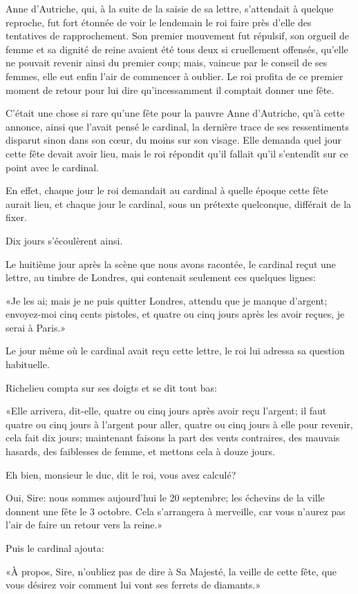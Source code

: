 Anne d'Autriche, qui, à la suite de la saisie de sa lettre, s'attendait à quelque reproche, fut fort étonnée de voir le lendemain le roi faire près d'elle des tentatives de rapprochement. Son premier mouvement fut répulsif, son orgueil de femme et sa dignité de reine avaient été tous deux si cruellement offensés, qu'elle ne pouvait revenir ainsi du premier coup; mais, vaincue par le conseil de ses femmes, elle eut enfin l'air de commencer à oublier. Le roi profita de ce premier moment de retour pour lui dire qu'incessamment il comptait donner une fête. 

C'était une chose si rare qu'une fête pour la pauvre Anne d'Autriche, qu'à cette annonce, ainsi que l'avait pensé le cardinal, la dernière trace de ses ressentiments disparut sinon dans son cœur, du moins sur son visage. Elle demanda quel jour cette fête devait avoir lieu, mais le roi répondit qu'il fallait qu'il s'entendît sur ce point avec le cardinal. 

En effet, chaque jour le roi demandait au cardinal à quelle époque cette fête aurait lieu, et chaque jour le cardinal, sous un prétexte quelconque, différait de la fixer. 

Dix jours s'écoulèrent ainsi. 

Le huitième jour après la scène que nous avons racontée, le cardinal reçut une lettre, au timbre de Londres, qui contenait seulement ces quelques lignes: 

«Je les ai; mais je ne puis quitter Londres, attendu que je manque d'argent; envoyez-moi cinq cents pistoles, et quatre ou cinq jours après les avoir reçues, je serai à Paris.» 

Le jour même où le cardinal avait reçu cette lettre, le roi lui adressa sa question habituelle. 

Richelieu compta sur ses doigts et se dit tout bas: 

«Elle arrivera, dit-elle, quatre ou cinq jours après avoir reçu l'argent; il faut quatre ou cinq jours à l'argent pour aller, quatre ou cinq jours à elle pour revenir, cela fait dix jours; maintenant faisons la part des vents contraires, des mauvais hasards, des faiblesses de femme, et mettons cela à douze jours. 

\speak  Eh bien, monsieur le duc, dit le roi, vous avez calculé? 

\speak  Oui, Sire: nous sommes aujourd'hui le 20 septembre; les échevins de la ville donnent une fête le 3 octobre. Cela s'arrangera à merveille, car vous n'aurez pas l'air de faire un retour vers la reine.» 

Puis le cardinal ajouta: 

«À propos, Sire, n'oubliez pas de dire à Sa Majesté, la veille de cette fête, que vous désirez voir comment lui vont ses ferrets de diamants.» 